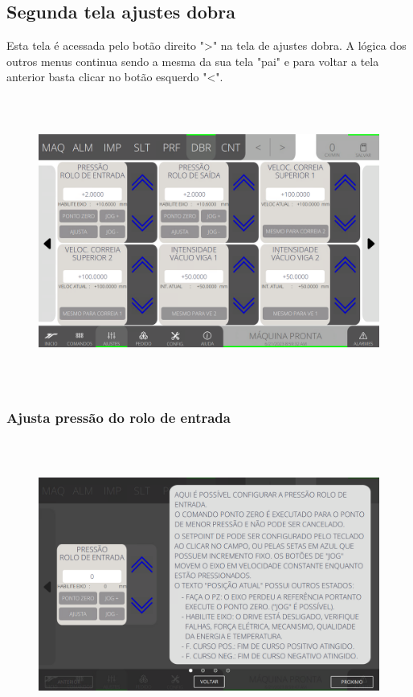 \subsection{Segunda tela ajustes dobra}\label{miniTelaAjustesDobra2}
Esta tela é acessada pelo botão direito "\textgreater" na tela de ajustes dobra. A lógica dos outros menus continua sendo a mesma da sua tela "pai" e para voltar a tela anterior basta clicar no botão esquerdo "\textless{}".
\vspace*{\fill}
\begin{figure}[h]
  \centering
  \includegraphics[width=576px,height=360px]{src/imagesMiniline/07-Folder/Settings/e0.png}
\end{figure}
\vspace*{\fill}


\newpage
\thispagestyle{fancy}
\vspace*{40 pt}
\subsubsection{\small{Ajusta pressão do rolo de entrada}}\label{miniTelaAjustesDobra2AjustaPressaoRoloEntrada}
\vspace*{\fill}
\begin{figure}[h]
  \centering
  \includegraphics[width=576px,height=360px]{src/imagesMiniline/07-Folder/Settings/e1.png}
\end{figure}
\vspace*{\fill}

